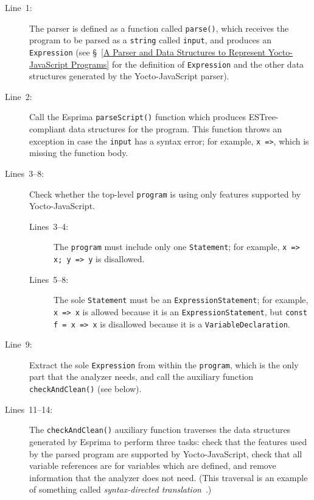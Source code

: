 \documentclass[12pt, oneside]{book}
\begin{document}
\begin{description}
\item [Line~1:]

The parser is defined as a function called \texttt{parse()}, which receives the program to be parsed as a \texttt{string} called \texttt{input}, and produces an \texttt{Expression} (see §~\ref{A Parser and Data Structures to Represent Yocto-JavaScript Programs} for the definition of \texttt{Expression} and the other data structures generated by the Yocto-JavaScript parser).

\item [Line~2:]

Call the Esprima \texttt{parseScript()} function which produces ESTree-compliant data structures for the program. This function throws an exception in case the \texttt{input} has a syntax error; for example, \texttt{x =>}, which is missing the function body.

\item [Lines~3–8:]

Check whether the top-level \texttt{program} is using only features supported by Yocto-JavaScript.

\begin{description}
\item [Lines~3–4:]

The \texttt{program} must include only one \texttt{Statement}; for example, \texttt{x => x; y => y} is disallowed.

\item [Lines~5–8:]

The sole \texttt{Statement} must be an \texttt{ExpressionStatement}; for example, \texttt{x => x} is allowed because it is an \texttt{ExpressionStatement}, but \texttt{const f = x => x} is disallowed because it is a \texttt{VariableDeclaration}.
\end{description}

\item [Line~9:]

Extract the sole \texttt{Expression} from within the \texttt{program}, which is the only part that the analyzer needs, and call the auxiliary function \texttt{checkAndClean()} (see below).

\item [Lines~11–14:]

The \texttt{checkAndClean()} auxiliary function traverses the data structures generated by Esprima to perform three tasks: check that the features used by the parsed program are supported by Yocto-JavaScript, check that all variable references are for variables which are defined, and remove information that the analyzer does not need. (This traversal is an example of something called \emph{syntax-directed translation}~\cite[§~2]{dragon-book}.)


\end{description}
\end{document}
